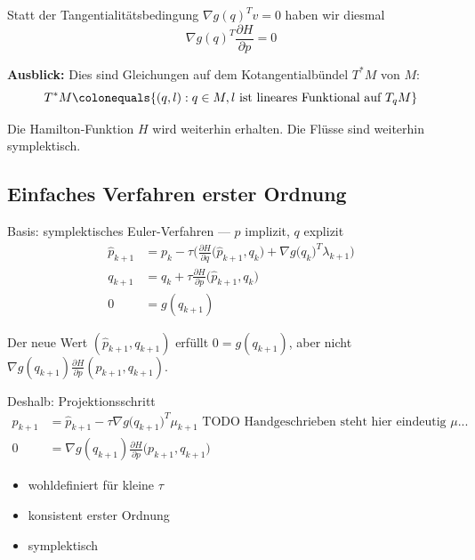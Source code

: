 Statt der Tangentialitätsbedingung $\nabla g(q)^T v = 0$ haben wir diesmal
\begin{equation*}
	\nabla g(q)^T \frac{\partial H}{\partial p} = 0
\end{equation*}

\textbf{Ausblick:} Dies sind Gleichungen auf dem Kotangentialbündel $T^*M$ von $M$:
\begin{equation*}
	T^\ast M \colonequals \{ (q,l) : q \in M, l \text{ ist lineares Funktional auf } T_qM\}
\end{equation*}

Die Hamilton-Funktion $H$ wird weiterhin erhalten. Die Flüsse sind weiterhin symplektisch.

\subsection*{Einfaches Verfahren erster Ordnung}

Basis: symplektisches Euler-Verfahren --- $p$ implizit, $q$ explizit
\begin{align*}
	\hat p_{k+1} & = p_k - \tau \Bigg( \frac{\partial H}{\partial q} \Big( \hat p_{k+1}, q_k\Big) + \nabla g\big(q_k\big)^T \lambda_{k+1}\Bigg)
	\\
	q_{k+1} & = q_k + \tau \frac{\partial H}{\partial p} \Big(\hat p_{k+1}, q_k\Big)
	\\
	0 & = g(q_{k+1})
\end{align*}

Der neue Wert $(\hat p_{k+1}, q_{k+1})$ erfüllt $0 = g(q_{k+1})$, aber nicht $\nabla g(q_{k+1}) \frac{\partial H}{\partial p}(p_{k+1}, q_{k+1})$.

Deshalb: Projektionsschritt
\begin{align*}
	p_{k+1} & = \hat p_{k+1} - \tau \nabla g \big(q_{k+1}\big)^T \mu_{k+1}\text{  TODO Handgeschrieben steht hier eindeutig $\mu$...}
	\\
	0 & = \nabla g (q_{k+1}) \frac{\partial H}{\partial p} \Big(p_{k+1}, q_{k+1}\Big)
\end{align*}
\begin{itemize}
	\item wohldefiniert für kleine $\tau$
	\item konsistent erster Ordnung
	\item symplektisch
\end{itemize}